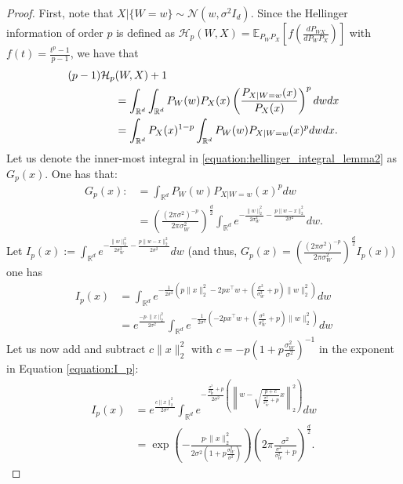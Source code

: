 \documentclass[conference]{IEEEtran}
\theoremstyle{plain}
\theoremstyle{definition}
\theoremstyle{remark}
\begin{document}
\begin{proof}
First, note that $X|\{W=w\}\sim\mathcal{N}(w, \sigma^2I_d)$. Since the Hellinger information of order $p$ is defined as $\mathcal{H}_p(W,X) = \mathbb{E}_{P_{W}P_{X}}\left[f\left(\frac{dP_{WX}}{dP_{W}P_{X}}\right)\right]$ with $f(t) = \frac{t^p-1}{p-1}$, we have that
\begin{align}
    (p-1)\mathcal{H}_p&(W, X)+1\notag \\
    &=\int_{\mathbb{R}^d} \int_{\mathbb{R}^d} P_{W}(w)P_{X}(x) \left(\frac{P_{X|W=w}(x)}{P_{X}(x)}\right)^p dwdx \\
    &=\int_{\mathbb{R}^d} P_{X}(x)^{1-p} \int_{\mathbb{R}^d} P_{W}(w) P_{X|W=w}(x)^p dwdx.\label{equation:hellinger_integral_lemma2}
\end{align}
Let us denote the inner-most  integral in \eqref{equation:hellinger_integral_lemma2} as $G_p(x)$. One has that:
\begin{align}
    G_p(x):&= \int_{\mathbb{R}^d}P_{{W}}({w})P_{{X}|{W}={w}}({x})^{p} d{w} \\
    &= \left(\frac{(2\pi\sigma^2)^{-p}}{2\pi \sigma_W^2}\right)^{\frac{d}{2}} \int_{\mathbb{R}^d} e^{-\frac{\|{w}\|_2^2}{2\sigma_W^2} - \frac{p \|{w}-{x}\|_2^2}{2\sigma^2}}d{w}.\label{equation:G_p}
\end{align}
Let $I_p(x):=\int_{\mathbb{R}^d} e^{-\frac{\|{w}\|_2^2}{2\sigma_W^2} - \frac{p \|{w}-{x}\|_2^2}{2\sigma^2}}d{w}$ (and thus, $G_p(x)=\left(\frac{(2\pi\sigma^2)^{-p}}{2\pi \sigma_W^2}\right)^{\frac{d}{2}} I_p(x)$) one has
\begin{align}
    I_p(x)&=\int_{\mathbb{R}^d} e^{-\frac{1}{2\sigma^2} \left(p\|{x}\|_2^2-2p{x}^\top {w} + \left(\frac{\sigma^2}{\sigma_W^2}+p\right)\|{w}\|_2^2\right)}d{w}\\
    &= e^{\frac{-p\cdot \|{x}\|_2^2}{2\sigma^2}}\int_{\mathbb{R}^d} e^{-\frac{1}{2\sigma^2} \left(-2p{x}^\top {w} + \left(\frac{\sigma^2}{\sigma_W^2}+p\right)\|{w}\|_2^2\right)}d{w}\label{equation:I_p}
\end{align}
Let us now add and subtract %
$c\|x\|_2^2$ with $c=-p\left(1+p\frac{\sigma_W^2}{\sigma^2}\right)^{-1}$ in the exponent in Equation \eqref{equation:I_p}:
\begin{align}
    I_p(x) &= e^{{\frac{c\|{x}\|_2^2}{2\sigma^2}}}\int_{\mathbb{R}^d} e^{-\frac{\frac{\sigma^2}{\sigma_W^2}+p}{2\sigma^2} \left(\left\|{w}-\sqrt{\frac{p+c}{\frac{\sigma^2}{\sigma_W^2}+p}}{x}\right\|_2^2\right)}d{w} \\
    &= \exp\left(-{\frac{p\cdot \|{x}\|_2^2}{2\sigma^2\left(1+p\frac{\sigma_W^2}{\sigma^2}\right)}}\right) \left(2\pi \frac{\sigma^2}{\frac{\sigma^2}{\sigma_W^2}+p}\right)^{\frac{d}{2}}\label{equation:I_pCompleted}.

\end{align}
\end{proof}
\end{document}
